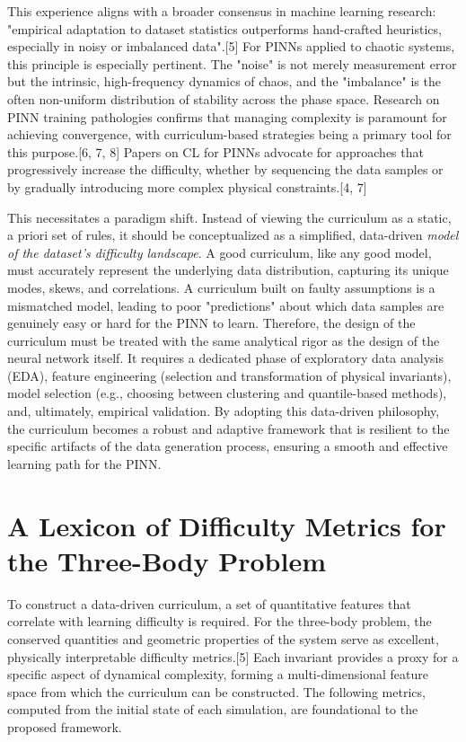 This experience aligns with a broader consensus in machine learning research: "empirical adaptation to dataset statistics outperforms hand-crafted heuristics, especially in noisy or imbalanced data".[5] For PINNs applied to chaotic systems, this principle is especially pertinent. The "noise" is not merely measurement error but the intrinsic, high-frequency dynamics of chaos, and the "imbalance" is the often non-uniform distribution of stability across the phase space. Research on PINN training pathologies confirms that managing complexity is paramount for achieving convergence, with curriculum-based strategies being a primary tool for this purpose.[6, 7, 8] Papers on CL for PINNs advocate for approaches that progressively increase the difficulty, whether by sequencing the data samples or by gradually introducing more complex physical constraints.[4, 7]

This necessitates a paradigm shift. Instead of viewing the curriculum as a static, a priori set of rules, it should be conceptualized as a simplified, data-driven \textit{model of the dataset's difficulty landscape}. A good curriculum, like any good model, must accurately represent the underlying data distribution, capturing its unique modes, skews, and correlations. A curriculum built on faulty assumptions is a mismatched model, leading to poor "predictions" about which data samples are genuinely easy or hard for the PINN to learn. Therefore, the design of the curriculum must be treated with the same analytical rigor as the design of the neural network itself. It requires a dedicated phase of exploratory data analysis (EDA), feature engineering (selection and transformation of physical invariants), model selection (e.g., choosing between clustering and quantile-based methods), and, ultimately, empirical validation. By adopting this data-driven philosophy, the curriculum becomes a robust and adaptive framework that is resilient to the specific artifacts of the data generation process, ensuring a smooth and effective learning path for the PINN.

\section{A Lexicon of Difficulty Metrics for the Three-Body Problem}

To construct a data-driven curriculum, a set of quantitative features that correlate with learning difficulty is required. For the three-body problem, the conserved quantities and geometric properties of the system serve as excellent, physically interpretable difficulty metrics.[5] Each invariant provides a proxy for a specific aspect of dynamical complexity, forming a multi-dimensional feature space from which the curriculum can be constructed. The following metrics, computed from the initial state of each simulation, are foundational to the proposed framework.

